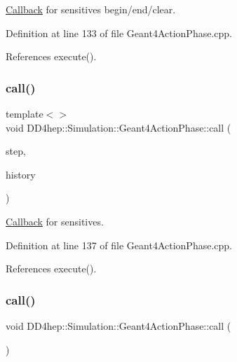 \hyperlink{class_d_d4hep_1_1_callback}{Callback} for sensitives begin/end/clear. 



Definition at line 133 of file Geant4\+Action\+Phase.\+cpp.



References execute().

\hypertarget{class_d_d4hep_1_1_simulation_1_1_geant4_action_phase_a72d099369f54e89a9d95199bcc5df4e7}{}\label{class_d_d4hep_1_1_simulation_1_1_geant4_action_phase_a72d099369f54e89a9d95199bcc5df4e7} 
\subsubsection{\texorpdfstring{call()}{call()}\hspace{0.1cm}{\footnotesize\ttfamily [8/12]}}
{\footnotesize\ttfamily template$<$$>$ \\
void D\+D4hep\+::\+Simulation\+::\+Geant4\+Action\+Phase\+::call (\begin{DoxyParamCaption}\item[{G4\+Step $\ast$}]{step,  }\item[{G4\+Touchable\+History $\ast$}]{history }\end{DoxyParamCaption})}



\hyperlink{class_d_d4hep_1_1_callback}{Callback} for sensitives. 



Definition at line 137 of file Geant4\+Action\+Phase.\+cpp.



References execute().

\hypertarget{class_d_d4hep_1_1_simulation_1_1_geant4_action_phase_ae0022a7ef73336336dc256644bd06a12}{}\label{class_d_d4hep_1_1_simulation_1_1_geant4_action_phase_ae0022a7ef73336336dc256644bd06a12} 
\subsubsection{\texorpdfstring{call()}{call()}\hspace{0.1cm}{\footnotesize\ttfamily [9/12]}}
{\footnotesize\ttfamily void D\+D4hep\+::\+Simulation\+::\+Geant4\+Action\+Phase\+::call (\begin{DoxyParamCaption}{ }\end{DoxyParamCaption})}



